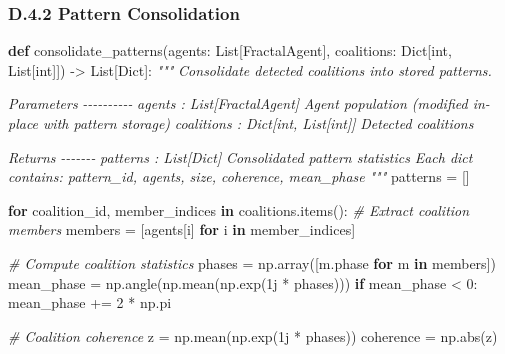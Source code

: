 \documentclass[
]{article}
\newenvironment{Shaded}{}{}
\newcommand{\BuiltInTok}[1]{\textcolor[rgb]{0.00,0.50,0.00}{#1}}
\newcommand{\CommentTok}[1]{\textcolor[rgb]{0.38,0.63,0.69}{\textit{#1}}}
\newcommand{\ControlFlowTok}[1]{\textcolor[rgb]{0.00,0.44,0.13}{\textbf{#1}}}
\newcommand{\DecValTok}[1]{\textcolor[rgb]{0.25,0.63,0.44}{#1}}
\newcommand{\KeywordTok}[1]{\textcolor[rgb]{0.00,0.44,0.13}{\textbf{#1}}}
\newcommand{\NormalTok}[1]{#1}
\newcommand{\OperatorTok}[1]{\textcolor[rgb]{0.40,0.40,0.40}{#1}}
\newcommand{\OtherTok}[1]{\textcolor[rgb]{0.00,0.44,0.13}{#1}}
\begin{document}
\subsubsection{D.4.2 Pattern
Consolidation}\label{d.4.2-pattern-consolidation}

\begin{Shaded}
\begin{Highlighting}[]
\KeywordTok{def}\NormalTok{ consolidate\_patterns(agents: List[FractalAgent],}
\NormalTok{                        coalitions: Dict[}\BuiltInTok{int}\NormalTok{, List[}\BuiltInTok{int}\NormalTok{]]) }\OperatorTok{{-}\textgreater{}}\NormalTok{ List[Dict]:}
    \CommentTok{"""}
\CommentTok{    Consolidate detected coalitions into stored patterns.}

\CommentTok{    Parameters}
\CommentTok{    {-}{-}{-}{-}{-}{-}{-}{-}{-}{-}}
\CommentTok{    agents : List[FractalAgent]}
\CommentTok{        Agent population (modified in{-}place with pattern storage)}
\CommentTok{    coalitions : Dict[int, List[int]]}
\CommentTok{        Detected coalitions}

\CommentTok{    Returns}
\CommentTok{    {-}{-}{-}{-}{-}{-}{-}}
\CommentTok{    patterns : List[Dict]}
\CommentTok{        Consolidated pattern statistics}
\CommentTok{        Each dict contains: pattern\_id, agents, size, coherence, mean\_phase}
\CommentTok{    """}
\NormalTok{    patterns }\OperatorTok{=}\NormalTok{ []}

    \ControlFlowTok{for}\NormalTok{ coalition\_id, member\_indices }\KeywordTok{in}\NormalTok{ coalitions.items():}
        \CommentTok{\# Extract coalition members}
\NormalTok{        members }\OperatorTok{=}\NormalTok{ [agents[i] }\ControlFlowTok{for}\NormalTok{ i }\KeywordTok{in}\NormalTok{ member\_indices]}

        \CommentTok{\# Compute coalition statistics}
\NormalTok{        phases }\OperatorTok{=}\NormalTok{ np.array([m.phase }\ControlFlowTok{for}\NormalTok{ m }\KeywordTok{in}\NormalTok{ members])}
\NormalTok{        mean\_phase }\OperatorTok{=}\NormalTok{ np.angle(np.mean(np.exp(}\OtherTok{1j} \OperatorTok{*}\NormalTok{ phases)))}
        \ControlFlowTok{if}\NormalTok{ mean\_phase }\OperatorTok{\textless{}} \DecValTok{0}\NormalTok{:}
\NormalTok{            mean\_phase }\OperatorTok{+=} \DecValTok{2} \OperatorTok{*}\NormalTok{ np.pi}

        \CommentTok{\# Coalition coherence}
\NormalTok{        z }\OperatorTok{=}\NormalTok{ np.mean(np.exp(}\OtherTok{1j} \OperatorTok{*}\NormalTok{ phases))}
\NormalTok{        coherence }\OperatorTok{=}\NormalTok{ np.}\BuiltInTok{abs}\NormalTok{(z)}


\end{Highlighting}
\end{Shaded}
\end{document}
